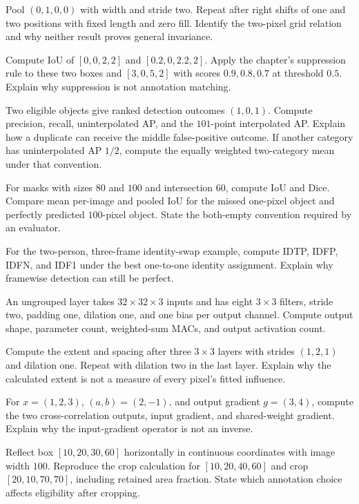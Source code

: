 \begin{exercises}
\item {}Pool $(0,1,0,0)$ with width and stride two. Repeat after right shifts of one and two positions with fixed length and zero fill. Identify the two-pixel grid relation and why neither result proves general invariance.
\item {}Compute IoU of $[0,0,2,2]$ and $[0.2,0,2.2,2]$. Apply the chapter's suppression rule to these two boxes and $[3,0,5,2]$ with scores $0.9,0.8,0.7$ at threshold $0.5$. Explain why suppression is not annotation matching.
\item {}Two eligible objects give ranked detection outcomes $(1,0,1)$. Compute precision, recall, uninterpolated AP, and the $101$-point interpolated AP. Explain how a duplicate can receive the middle false-positive outcome. If another category has uninterpolated AP $1/2$, compute the equally weighted two-category mean under that convention.
\item {}For masks with sizes $80$ and $100$ and intersection $60$, compute IoU and Dice. Compare mean per-image and pooled IoU for the missed one-pixel object and perfectly predicted $100$-pixel object. State the both-empty convention required by an evaluator.
\item {}For the two-person, three-frame identity-swap example, compute IDTP, IDFP, IDFN, and IDF1 under the best one-to-one identity assignment. Explain why framewise detection can still be perfect.
\item {}An ungrouped layer takes $32\times32\times3$ inputs and has eight $3\times3$ filters, stride two, padding one, dilation one, and one bias per output channel. Compute output shape, parameter count, weighted-sum MACs, and output activation count.
\item {}Compute the extent and spacing after three $3\times3$ layers with strides $(1,2,1)$ and dilation one. Repeat with dilation two in the last layer. Explain why the calculated extent is not a measure of every pixel's fitted influence.
\item {}For $x=(1,2,3)$, $(a,b)=(2,-1)$, and output gradient $g=(3,4)$, compute the two cross-correlation outputs, input gradient, and shared-weight gradient. Explain why the input-gradient operator is not an inverse.
\item {}Reflect box $[10,20,30,60]$ horizontally in continuous coordinates with image width $100$. Reproduce the crop calculation for $[10,20,40,60]$ and crop $[20,10,70,70]$, including retained area fraction. State which annotation choice affects eligibility after cropping.

\end{exercises}
